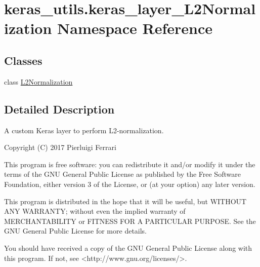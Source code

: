 \hypertarget{namespacekeras__utils_1_1keras__layer___l2_normalization}{}\section{keras\+\_\+utils.\+keras\+\_\+layer\+\_\+\+L2\+Normalization Namespace Reference}
\label{namespacekeras__utils_1_1keras__layer___l2_normalization}
\subsection*{Classes}
\begin{DoxyCompactItemize}
\item 
class \hyperlink{classkeras__utils_1_1keras__layer___l2_normalization_1_1_l2_normalization}{L2\+Normalization}
\end{DoxyCompactItemize}


\subsection{Detailed Description}
\begin{DoxyVerb}A custom Keras layer to perform L2-normalization.

Copyright (C) 2017 Pierluigi Ferrari

This program is free software: you can redistribute it and/or modify
it under the terms of the GNU General Public License as published by
the Free Software Foundation, either version 3 of the License, or
(at your option) any later version.

This program is distributed in the hope that it will be useful,
but WITHOUT ANY WARRANTY; without even the implied warranty of
MERCHANTABILITY or FITNESS FOR A PARTICULAR PURPOSE.  See the
GNU General Public License for more details.

You should have received a copy of the GNU General Public License
along with this program.  If not, see <http://www.gnu.org/licenses/>.
\end{DoxyVerb}
 
